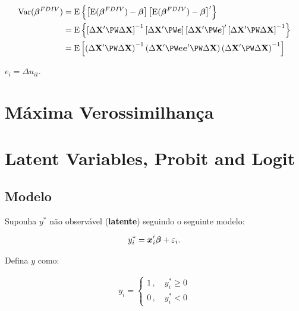 \documentclass[11pt, oneside, a4paper, article]{article}
\numberwithin{equation}{section}
\begin{document}
\begin{description}
\vspace{-1 em}
\begin{align*}
\Var( \betavec^{FDIV} ) &=
\E\left\{  
\left[ \E( \betavec^{FDIV} ) - \betavec \right] 
\left[ \E( \betavec^{FDIV} ) - \betavec \right]'
\right\}
\\
&=
\E\left\{  
\left[ \Delta \Xmat' \PW \Delta \Xmat \right]^{-1}
\left[ \Delta \Xmat' \PW \mbs{e} \right]
\left[ \Delta \Xmat' \PW \mbs{e} \right]'
\left[ \Delta \Xmat' \PW \Delta \Xmat \right]^{-1}
\right\}
\\
&=
\E\left[
\left( \Delta \Xmat' \PW \Delta \Xmat \right)^{-1}
\left( \Delta \Xmat' \PW \mbs{e} \mbs{e}' \PW \Delta \Xmat \right)
\left( \Delta \Xmat' \PW \Delta \Xmat \right)^{-1}
\right]
\end{align*}

\noindent
$e_{i} = \Delta u_{it}$.

\clearpage
\section{Máxima Verossimilhança}

\clearpage
\section{Latent Variables, Probit and Logit}

\subsection{Modelo}

Suponha $y^{*}$ não observável (\textbf{latente}) seguindo o seguinte modelo:

\vspace{-1 em}
\begin{align} \label{mod1:probit}
y_{i}^{*} = \boldsymbol{x}_{i}' \boldsymbol{\beta} + \varepsilon_{i}.
\end{align}

\noindent
Defina $y$ como:

\vspace{-1 em}
\begin{align*}
y_{i} =
\begin{cases}
1 \, , \quad y^{*}_{i} \geq 0
\\
0 \, , \quad y^{*}_{i} < 0
\end{cases}
\end{align*}


\end{description}
\end{document}
